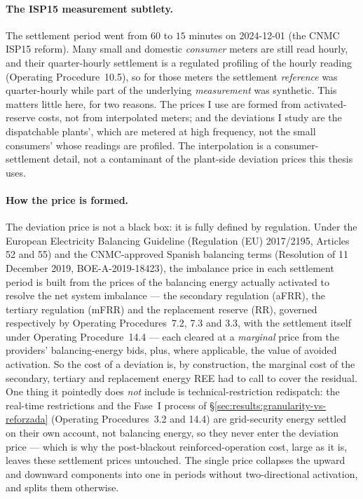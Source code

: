 \documentclass[11pt,a4paper]{article}
\theoremstyle{definition}
\theoremstyle{remark}
\theoremstyle{plain}
\begin{document}
\paragraph{The ISP15 measurement subtlety.} The settlement period went from $60$ to $15$ minutes on 2024-12-01 (the CNMC ISP15 reform). Many small and domestic \emph{consumer} meters are still read hourly, and their quarter-hourly settlement is a regulated profiling of the hourly reading (Operating Procedure~10.5), so for those meters the settlement \emph{reference} was quarter-hourly while part of the underlying \emph{measurement} was synthetic. This matters little here, for two reasons. The prices I use are formed from activated-reserve costs, not from interpolated meters; and the deviations I study are the dispatchable plants', which are metered at high frequency, not the small consumers' whose readings are profiled. The interpolation is a consumer-settlement detail, not a contaminant of the plant-side deviation prices this thesis uses.

\paragraph{How the price is formed.} The deviation price is not a black box: it is fully defined by regulation. Under the European Electricity Balancing Guideline (Regulation (EU) 2017/2195, Articles 52 and 55) and the CNMC-approved Spanish balancing terms (Resolution of 11 December 2019, BOE-A-2019-18423), the imbalance price in each settlement period is built from the prices of the balancing energy actually activated to resolve the net system imbalance --- the secondary regulation (aFRR), the tertiary regulation (mFRR) and the replacement reserve (RR), governed respectively by Operating Procedures~7.2, 7.3 and 3.3, with the settlement itself under Operating Procedure~14.4 --- each cleared at a \emph{marginal} price from the providers' balancing-energy bids, plus, where applicable, the value of avoided activation. So the cost of a deviation is, by construction, the marginal cost of the secondary, tertiary and replacement energy REE had to call to cover the residual. One thing it pointedly does \emph{not} include is technical-restriction redispatch: the real-time restrictions and the Fase~I process of \S\ref{sec:results:granularity-vs-reforzada} (Operating Procedures~3.2 and 14.4) are grid-security energy settled on their own account, not balancing energy, so they never enter the deviation price --- which is why the post-blackout reinforced-operation cost, large as it is, leaves these settlement prices untouched. The single price collapses the upward and downward components into one in periods without two-directional activation, and splits them otherwise.
\end{document}
